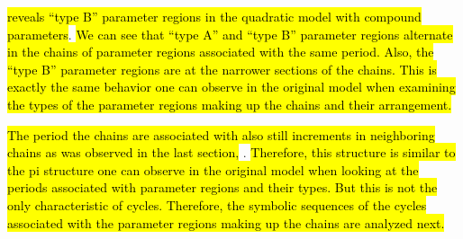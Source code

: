  \hl{reveals ``type B'' parameter regions in the quadratic model with compound parameters}.
\hl{
	We can see that ``type A'' and ``type B'' parameter regions alternate in the chains of parameter regions associated with the same period.
	Also, the ``type B'' parameter regions are at the narrower sections of the chains.
	This is exactly the same behavior one can observe in the original model when examining the types of the parameter regions making up the chains and their arrangement.
}

\hl{The period the chains are associated with also still increments in neighboring chains as was observed in the last section,} .
\hl{
	Therefore, this structure is similar to the \gls{pi} structure one can observe in the original model when looking at the periods associated with parameter regions and their types.
	But this is not the only characteristic of cycles.
	Therefore, the symbolic sequences of the cycles associated with the parameter regions making up the chains are analyzed next.
}

